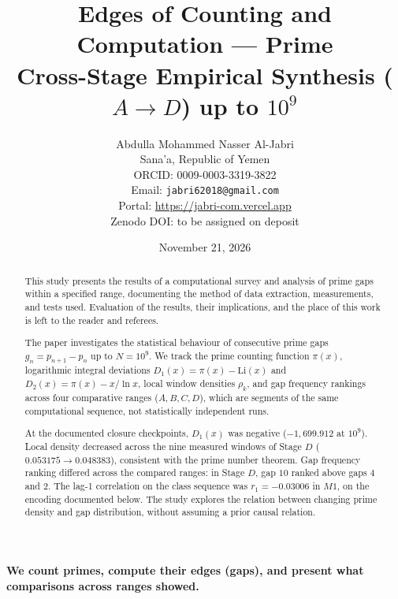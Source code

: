 \documentclass[12pt,a4paper]{article}
\title{\textbf{Edges of Counting and Computation — Prime}\\
\large Cross-Stage Empirical Synthesis ($A \rightarrow D$) up to $10^9$}
\author{Abdulla Mohammed Nasser Al-Jabri \\
Sana'a, Republic of Yemen \\
ORCID: 0009-0003-3319-3822 \\
Email: \texttt{jabri62018@gmail.com} \\
Portal: \url{https://jabri-com.vercel.app} \\
Zenodo DOI: to be assigned on deposit}
\date{November 21, 2026}
\begin{document}
\maketitle
\thispagestyle{firstpage}

\begin{center}
\end{center}
\vspace{0.3cm}

\begin{center}
\textbf{We count primes, compute their edges (gaps), and present what comparisons across ranges showed.}
\end{center}
\begin{abstract}
This study presents the results of a computational survey and analysis of prime gaps within a specified range, documenting the method of data extraction, measurements, and tests used. Evaluation of the results, their implications, and the place of this work is left to the reader and referees.

The paper investigates the statistical behaviour of consecutive prime gaps $g_n = p_{n+1} - p_n$ up to $N = 10^9$. We track the prime counting function $\pi(x)$, logarithmic integral deviations $D_1(x) = \pi(x) - \mathrm{Li}(x)$ and $D_2(x) = \pi(x) - x/\ln x$, local window densities $\rho_k$, and gap frequency rankings across four comparative ranges ($A, B, C, D$), which are segments of the same computational sequence, not statistically independent runs.

At the documented closure checkpoints, $D_1(x)$ was negative ($-1,699.912$ at $10^9$). Local density decreased across the nine measured windows of Stage $D$ ($0.053175 \rightarrow 0.048383$), consistent with the prime number theorem. Gap frequency ranking differed across the compared ranges: in Stage $D$, gap $10$ ranked above gaps $4$ and $2$. The lag-1 correlation on the class sequence was $r_1 = -0.03006$ in $M1$, on the encoding documented below. The study explores the relation between changing prime density and gap distribution, without assuming a prior causal relation.
\end{abstract}
\end{document}
